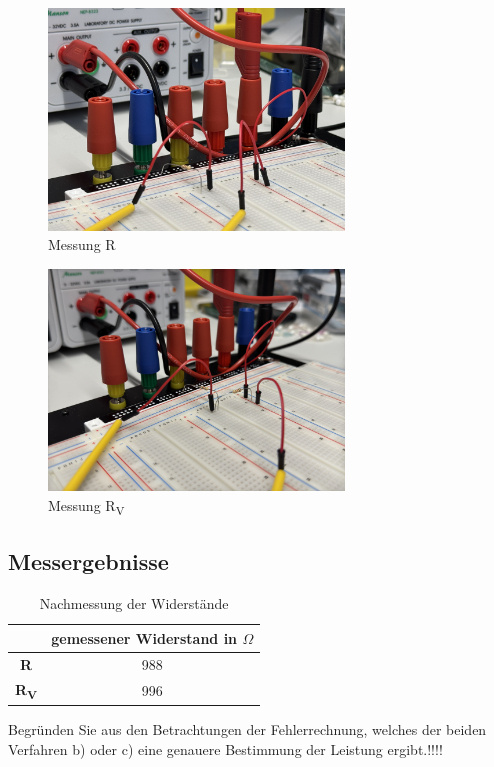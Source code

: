 \documentclass[a4paper,12pt]{article}
\begin{document}
\begin{figure}[H]
    \centering
    \includegraphics[width=0.7\textwidth]{../Quellen/Labor2/Fotos/IMG_3979.jpeg}
\caption{Messung R}
\end{figure}

\begin{figure}[H]
    \centering
    \includegraphics[width=0.7\textwidth]{../Quellen/Labor2/Fotos/IMG_3980.jpeg}
\caption{Messung R\textsubscript{V}}
\end{figure}


\subsection{Messergebnisse}
\begin{table}[H]
	\centering
	\begin{tabular}{|c|c|}
		\hline
		  & gemessener Widerstand in $\Omega$\\
		\hline		
		\textbf{R} & 988\\
		\hline
		\textbf{R\textsubscript{V}} & 996\\
		\hline
	\end{tabular}
	\caption{Nachmessung der Widerstände}
\end{table}
Begründen Sie aus den Betrachtungen der Fehlerrechnung, welches der beiden Verfahren b) oder c) 
eine genauere Bestimmung der Leistung ergibt.!!!!
\end{document}
